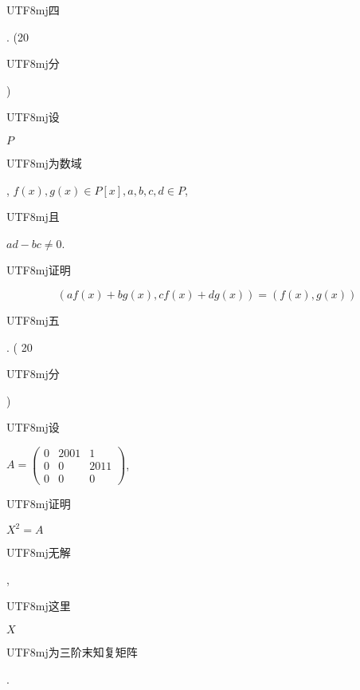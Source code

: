 \documentclass[10pt]{article}
\begin{document}
\begin{CJK}{UTF8}{mj}四\end{CJK}. (20 \begin{CJK}{UTF8}{mj}分\end{CJK}) \begin{CJK}{UTF8}{mj}设\end{CJK} $P$ \begin{CJK}{UTF8}{mj}为数域\end{CJK}, $f(x), g(x) \in P[x], a, b, c, d \in P$, \begin{CJK}{UTF8}{mj}且\end{CJK} $a d-b c \neq 0$. \begin{CJK}{UTF8}{mj}证明\end{CJK}
$$
(a f(x)+b g(x), c f(x)+d g(x))=(f(x), g(x))
$$
\begin{CJK}{UTF8}{mj}五\end{CJK}. ( 20 \begin{CJK}{UTF8}{mj}分\end{CJK}) \begin{CJK}{UTF8}{mj}设\end{CJK} $A=\left(\begin{array}{ccc}0 & 2001 & 1 \\ 0 & 0 & 2011 \\ 0 & 0 & 0\end{array}\right)$, \begin{CJK}{UTF8}{mj}证明\end{CJK} $X^{2}=A$ \begin{CJK}{UTF8}{mj}无解\end{CJK}, \begin{CJK}{UTF8}{mj}这里\end{CJK} $X$ \begin{CJK}{UTF8}{mj}为三阶末知复矩阵\end{CJK}.
\end{document}
